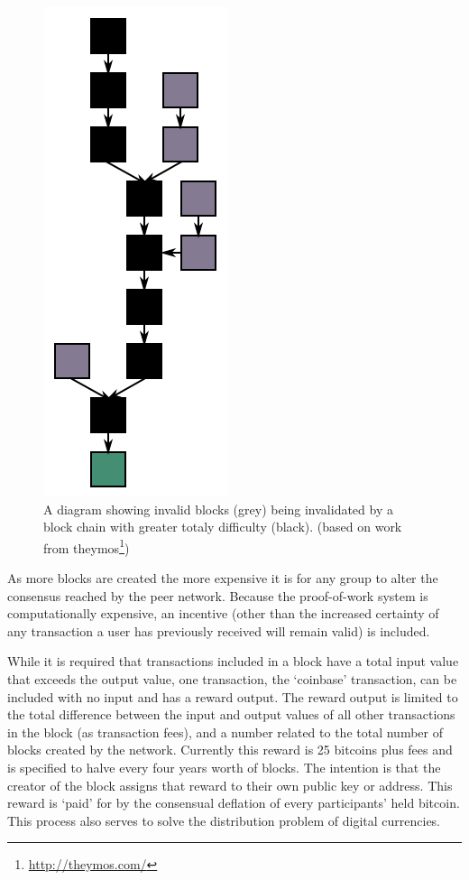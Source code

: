 \begin{figure}[t!]
    \centering
    \includegraphics[height=\columnwidth]{img/Blockchain}
    \caption{A diagram showing invalid blocks (grey) being invalidated by a block chain with greater totaly difficulty (black). (based on work from theymos\protect\footnote{\url{http://theymos.com/}})}
    \label{fig:blockchain}
\end{figure}

As more blocks are created the more expensive it is for any group to alter the consensus reached by the peer network.  Because the proof-of-work system is computationally expensive, an incentive (other than the increased certainty of any transaction a user has previously received will remain valid) is included.  

While it is required that transactions included in a block have a total input value that exceeds the output value, one transaction, the `coinbase' transaction, can be included with no input and has a reward output.  The reward output is limited to the total difference between the input and output values of all other transactions in the block (as transaction fees), and a number related to the total number of blocks created by the network. Currently this reward is 25 bitcoins plus fees and is specified to halve every four years worth of blocks.  The intention is that the creator of the block assigns that reward to their own public key or address. This reward is `paid' for by the consensual deflation of every participants' held bitcoin. This process also serves to solve the distribution problem of digital currencies.

